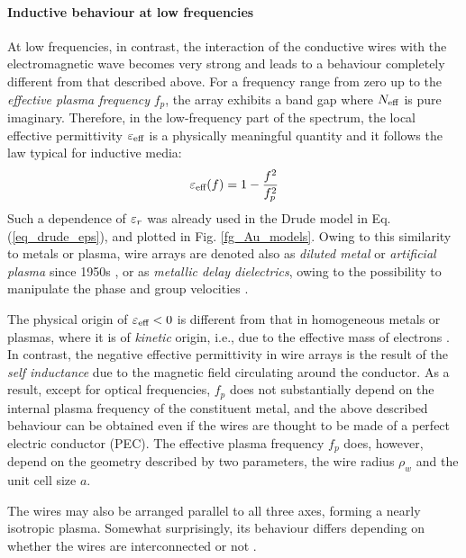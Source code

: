 \paragraph{Inductive behaviour at low frequencies}%
At low frequencies, in contrast, the interaction of the conductive wires with the electromagnetic wave becomes very strong and leads to a behaviour completely different from that described above. For a frequency range from zero up to the \textit{effective plasma frequency} $f_p$, the array exhibits a band gap where $N_{\text{eff} }$ is pure imaginary. Therefore, in the low-frequency part of the spectrum, the local effective permittivity $\varepsilon_{\text{eff} }$ is a physically meaningful quantity and it follows the law typical for inductive media:
\begin{equation} \varepsilon_{\text{eff} }(f) = 1 - \frac{f^{2}}{f_p^{2}}\label{eq_eeff_plasma}\end{equation}
Such a dependence of $\varepsilon_r$ was already used in the Drude model in Eq. (\ref{eq_drude_eps}), and plotted in Fig. \ref{fg_Au_models}. Owing to this similarity to metals or plasma, wire arrays are denoted also as \textit{diluted metal} or \textit{artificial plasma} since 1950s \cite{merkel1973simulation, rotman1962plasma}, or as \textit{metallic delay dielectrics}, owing to the possibility to manipulate the phase and group velocities  \cite[p. 54]{brown1953artificial}.

The physical origin of $\varepsilon_{\text{eff} }<0$ is different from that in homogeneous metals or plasmas, where it is of \textit{kinetic} origin, i.e., due to the effective mass of electrons \cite{marques2011bulk}. In contrast, the negative effective permittivity in wire arrays is the result of the \textit{self inductance} due to the magnetic field circulating around the conductor. As a result, except for optical frequencies, $f_p$ does not substantially depend on the internal plasma frequency of the constituent metal, and the above described behaviour can be obtained even if the wires are thought to be made of a perfect electric conductor (PEC).
The effective plasma frequency $f_p$ does, however, depend on the geometry described by two parameters, the wire radius $\rho_w$ and the unit cell size $a$. 

The wires may also be arranged parallel to all three axes, forming a nearly isotropic plasma. Somewhat surprisingly, its behaviour differs depending on whether the wires are interconnected or not \cite{silveirinha2009nonlocal}.

